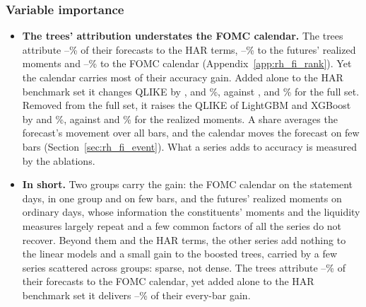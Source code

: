\subsubsection{Variable importance}
\label{sec:rh_fi_use}
\begin{itemize}
\item \textbf{The trees' attribution understates the FOMC calendar.} The trees attribute
  \rhfipHarMin--\rhfipHarMax\% of their forecasts to the HAR terms, \rhfipMomMin--\rhfipMomMax\% to the futures'
  realized moments and \rhfipFomcBucketMin--\rhfipFomcBucketMax\% to the FOMC calendar
  (Appendix~\ref{app:rh_fi_rank}). Yet the calendar carries most of their accuracy gain. Added alone to the HAR
  benchmark set it changes QLIKE by \rhabLgbmAddFomcAllPct, \rhabXgbAddFomcAllPct{} and \rhabRfAddFomcAllPct\%,
  against \rhabLgbmFullAllPct, \rhabXgbFullAllPct{} and \rhabRfFullAllPct\% for the full set. Removed from the full
  set, it raises the QLIKE of LightGBM and XGBoost by \rhabLgbmLoFomcAllPct{} and \rhabXgbLoFomcAllPct\%, against
  \rhabLgbmLoRmAllPct{} and \rhabXgbLoRmAllPct\% for the realized moments. A share averages the forecast's movement
  over all bars, and the calendar moves the forecast on few bars (Section~\ref{sec:rh_fi_event}). What a series adds
  to accuracy is measured by the ablations.
\item \textbf{In short.} Two groups carry the gain: the FOMC calendar on the statement days, in one group and on
  few bars, and the futures' realized moments on ordinary days, whose information the constituents' moments and the
  liquidity measures largely repeat and a few common factors of all the series do not recover. Beyond them and the HAR
  terms, the other \rhbyFLNSeries{} series add nothing to the linear models and a small gain to the boosted trees,
  carried by a few series scattered across groups: sparse, not dense. The trees attribute
  \rhfipFomcBucketMin--\rhfipFomcBucketMax\% of their forecasts to the FOMC calendar, yet added alone to the HAR
  benchmark set it delivers \rhabTreeFomcGainShareMin--\rhabTreeFomcGainShareMax\% of their every-bar gain.
\end{itemize}
\iffalse
